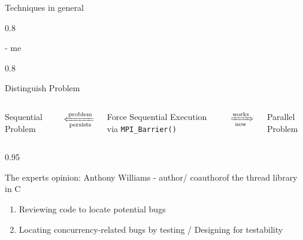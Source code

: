 \documentclass[aspectratio=1610]{beamer}
\newcommand{\Rplus}{\protect\hspace{-.1em}\protect\raisebox{.35ex}{\smaller{\smaller\textbf{+}}}}
\newcommand{\Cpp}{\mbox{C\Rplus\Rplus}\xspace}
\newenvironment{centeredblock}[2][0.8\textwidth]
{ %
	\begin{center}
		\begin{varwidth}{#1} %
			\begin{block}{#2}
				\centering
			}
			{ %
			\end{block}
		\end{varwidth}
	\end{center}
}
\begin{document}
	\begin{frame}[fragile]{Techniques in general}
		\begin{centeredblock}{}
			 - me 
		\end{centeredblock}
		
		\pause
		\begin{centeredblock}{Distinguish Problem}
			\begin{columns}
				\hfill
				\begin{column}{0.15 \textwidth}
					\begin{block}{}
						Sequential Problem
					\end{block}
				\end{column}
				\hfill
				$\xLeftarrow[\text{persists}]{\text{problem}}$ 
				\hfill
				\begin{column}{0.3 \textwidth}
					\begin{block}{}
						Force Sequential Execution via \texttt{MPI\_Barrier()}
					\end{block}
				\end{column}
				\hfill
				$\xRightarrow[\text{now}]{\text{works}}$
				\hfill
				\begin{column}{0.15 \textwidth}
					\begin{block}{}
						Parallel Problem
					\end{block}
				\end{column}
				\hfill
			\end{columns}
		\end{centeredblock}
		\pause
		\begin{centeredblock}[0.95 \textwidth]{The experts opinion: Anthony Williams - author/ coauthorof the thread library in \Cpp}
			\begin{enumerate}
				\item Reviewing code to locate potential bugs
				\item Locating concurrency-related bugs by testing / Designing for testability
			\end{enumerate}
		\end{centeredblock}
	\end{frame}
	
\end{document}
